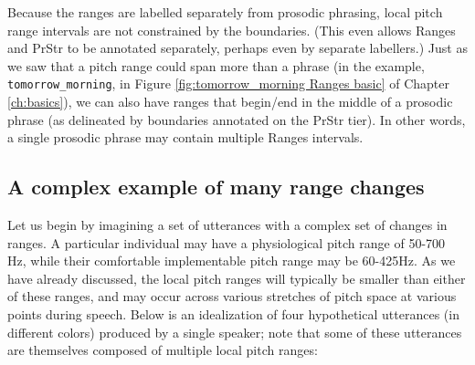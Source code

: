 \documentclass[11pt, twoside]{memoir}
\begin{document}
Because the ranges are labelled separately from prosodic phrasing, local pitch range intervals are not constrained by the boundaries. (This even allows Ranges and PrStr to be annotated separately, perhaps even by separate labellers.) Just as we saw that a pitch range could span more than a phrase (in the example, \texttt{tomorrow\_morning}, in Figure \ref{fig:tomorrow_morning Ranges basic} of Chapter \ref{ch:basics}), we can also have ranges that begin\slash end in the middle of a prosodic phrase (as delineated by boundaries annotated on the PrStr tier). In other words, a single prosodic phrase may contain multiple Ranges intervals.

\subsection{A complex example of many range changes}\label{sec:a-complex-example-of-many-range-changes}

Let us begin by imagining a set of utterances with a complex set of changes in ranges. A particular individual may have a physiological pitch range of 50-700 Hz, while their comfortable implementable pitch range may be 60-425Hz. As we have already discussed, the local pitch ranges will typically be smaller than either of these ranges, and may occur across various stretches of pitch space at various points during speech. Below is an idealization of four hypothetical utterances (in different colors) produced by a single speaker; note that some of these utterances are themselves composed of multiple local pitch ranges:
\end{document}
